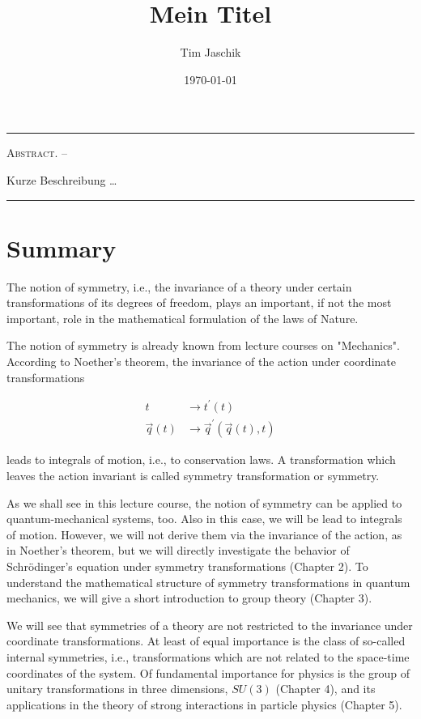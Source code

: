 \documentclass[10pt, letterpaper]{article}
\title{Mein Titel}
\author{Tim Jaschik}
\date{\today}
\renewenvironment{abstract}
  {
    \begin{adjustwidth}{1.5cm}{1.5cm}
    \small
    \textsc{Abstract. –}%
  }
  {
    \end{adjustwidth}
  }
\begin{document}
\maketitle
\rule{\textwidth}{0.5pt}
\begin{abstract}
Kurze Beschreibung …
\end{abstract}
\rule{\textwidth}{0.5pt}
\vspace{0.5cm}

\tableofcontents

\pagebreak




\section{Summary}
The notion of symmetry, i.e., the invariance of a theory under certain transformations of its degrees of freedom, plays an important, if not the most important, role in the mathematical formulation of the laws of Nature.

The notion of symmetry is already known from lecture courses on "Mechanics". According to Noether's theorem, the invariance of the action under coordinate transformations

$$
\begin{aligned}
t & \longrightarrow t^{\prime}(t) \\
\vec{q}(t) & \longrightarrow \vec{q}^{\prime}(\vec{q}(t), t)
\end{aligned}
$$

leads to integrals of motion, i.e., to conservation laws. A transformation which leaves the action invariant is called symmetry transformation or symmetry.

As we shall see in this lecture course, the notion of symmetry can be applied to quantum-mechanical systems, too. Also in this case, we will be lead to integrals of motion. However, we will not derive them via the invariance of the action, as in Noether's theorem, but we will directly investigate the behavior of Schrödinger's equation under symmetry transformations (Chapter 2). To understand the mathematical structure of symmetry transformations in quantum mechanics, we will give a short introduction to group theory (Chapter 3).

We will see that symmetries of a theory are not restricted to the invariance under coordinate transformations. At least of equal importance is the class of so-called internal symmetries, i.e., transformations which are not related to the space-time coordinates of the system. Of fundamental importance for physics is the group of unitary transformations in three dimensions, $S U(3)$ (Chapter 4), and its applications in the theory of strong interactions in particle physics (Chapter 5).
\end{document}
